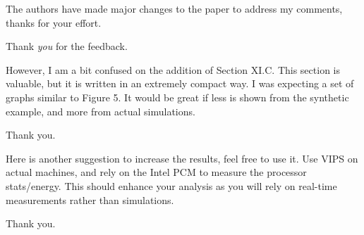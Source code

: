 \begin{reviewer}
The authors have made major changes to the paper to address my comments, thanks
for your effort.
\end{reviewer}

\begin{authors}
Thank \emph{you} for the feedback.
\end{authors}

\begin{reviewer}
However, I am a bit confused on the addition of Section XI.C. This section is
valuable, but it is written in an extremely compact way. I was expecting a set
of graphs similar to Figure 5. It would be great if less is shown from the
synthetic example, and more from actual simulations.
\end{reviewer}

\begin{authors}
Thank you.
\end{authors}

\begin{reviewer}
Here is another suggestion to increase the results, feel free to use it. Use
VIPS on actual machines, and rely on the Intel PCM to measure the processor
stats/energy. This should enhance your analysis as you will rely on real-time
measurements rather than simulations.
\end{reviewer}

\begin{authors}
Thank you.
\end{authors}
